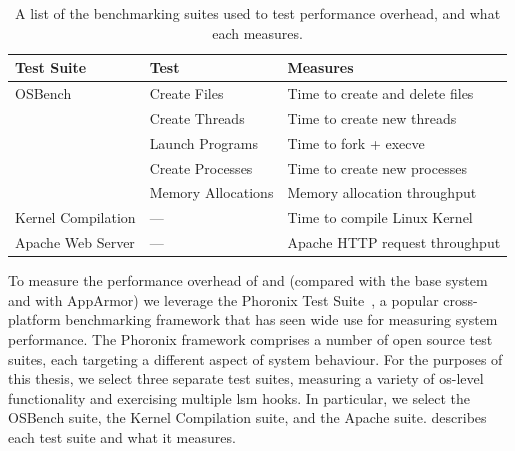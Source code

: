 \begin{table}[htp]
  \centering
  \footnotesize
  \caption[List of benchmarking suites and what they measure]{
    A list of the benchmarking suites used to test performance overhead, and what each
    measures.
  }%
  \label{tab:suites}
  \begin{tabular}{llp{3in}}
  \toprule
  Test Suite & Test & Measures \\
  \midrule
  OSBench                    & Create Files       & Time to create and delete files \\
                             & Create Threads     & Time to create new threads \\
                             & Launch Programs    & Time to fork + execve \\
                             & Create Processes   & Time to create new processes \\
                             & Memory Allocations & Memory allocation throughput \\
  Kernel Compilation         & ---                & Time to compile Linux Kernel \\
  Apache Web Server          & ---                & Apache HTTP request throughput \\
  \bottomrule
  \end{tabular}
\end{table}

To measure the performance overhead of \bpfbox{} and \bpfcontain{} (compared with the base
system and with AppArmor) we leverage the Phoronix Test Suite~\cite{phoronix}, a popular
cross-platform benchmarking framework that has seen wide use for measuring system
performance. The Phoronix framework comprises a number of open source test suites, each
targeting a different aspect of system behaviour. For the purposes of this thesis, we
select three separate test suites, measuring a variety of \gls{os}-level functionality and
exercising multiple \gls{lsm} hooks. In particular, we select the OSBench suite, the
Kernel Compilation suite, and the Apache suite.  describes each test
suite and what it measures.

